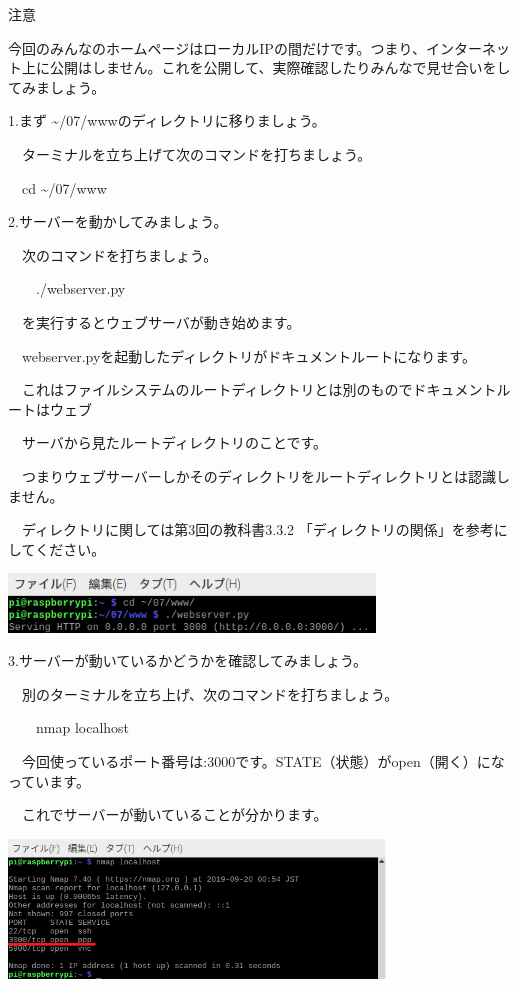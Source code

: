 \documentclass[a4paper,12pt,dvipdfmx]{jarticle}
\begin{document}
注意

今回のみんなのホームページはローカルIPの間だけです。つまり、インターネット上に公開はしません。これを公開して、実際確認したりみんなで見せ合いをしてみましょう。


\bigskip

1.まず
{\textasciitilde}/07/wwwのディレクトリに移りましょう。

\ \ ターミナルを立ち上げて次のコマンドを打ちましょう。

\ \ cd {\textasciitilde}/07/www


\bigskip

2.サーバーを動かしてみましょう。

\ \ 次のコマンドを打ちましょう。

\ \ 　./webserver.py

\ \ を実行するとウェブサーバが動き始めます。

\ \ webserver.pyを起動したディレクトリがドキュメントルートになります。

\ \ これはファイルシステムのルートディレクトリとは別のものでドキュメントルートはウェブ

\ \ サーバから見たルートディレクトリのことです。

\ \ つまりウェブサーバーしかそのディレクトリをルートディレクトリとは認識しません。

\ \ ディレクトリに関しては第3回の教科書3.3.2 「ディレクトリの関係」を参考にしてください。


\centering
\includegraphics[width=0.73\textwidth]{ome7-img038.png}
\flushleft

3.サーバーが動いているかどうかを確認してみましょう。

\ \ 別のターミナルを立ち上げ、次のコマンドを打ちましょう。

\ \ 　nmap localhost

\ \ 今回使っているポート番号は:3000です。STATE（状態）がopen（開く）になっています。

\ \ これでサーバーが動いていることが分かります。

\centering
\includegraphics[width=0.75\textwidth]{ome7-img039.png}
\flushleft
\end{document}
